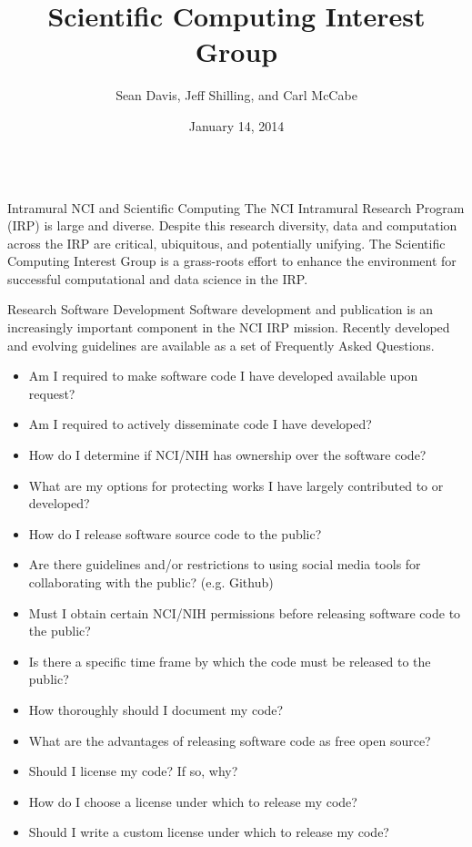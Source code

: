 \documentclass[final]{beamer}
\title{Scientific Computing Interest Group}
\author{Sean Davis, Jeff Shilling, and Carl McCabe}
\date{January 14, 2014}
\begin{document}
\begin{frame}[t]
  \begin{columns}[t]

    \begin{column}{0.3\linewidth}
      \begin{block}{Intramural NCI and Scientific Computing}
The NCI Intramural Research Program (IRP) is large and diverse.  Despite this research diversity, data and computation across the IRP are critical, ubiquitous, and potentially unifying.  The Scientific Computing Interest Group is a grass-roots effort to enhance the environment for successful computational and data science in the IRP.
      \end{block}
      \begin{block}{Research Software Development}
\small{Software development and publication is an increasingly important component in the NCI IRP mission. Recently developed and evolving guidelines are available as a set of Frequently Asked Questions.}
{\tiny
\begin{itemize}
\item{Am I required to make software code I have developed available upon request?}
\item{Am I required to actively disseminate code I have developed?}
\item{How do I determine if NCI/NIH has ownership over the software code?}
\item{What are my options for protecting works I have largely contributed to or developed?}
\item{How do I release software source code to the public?}
\item{Are there guidelines and/or restrictions to using social media tools for collaborating with the public? (e.g. Github)}
\item{Must I obtain certain NCI/NIH permissions before releasing software code to the public?}
\item{Is there a specific time frame by which the code must be released to the public?}
\item{How thoroughly should I document my code?}
\item{What are the advantages of releasing software code as free open source?}
\item{Should I license my code?  If so, why?}
\item{How do I choose a license under which to release my code?}
\item{Should I write a custom license under which to release my code?}

\end{itemize}}
\end{block}
\end{column}
\end{columns}
\end{frame}
\end{document}
